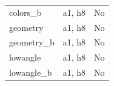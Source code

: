 \begin{longtable}{>{\raggedright\arraybackslash}p{.47\linewidth}>{\raggedright\arraybackslash}p{.25\linewidth}l}
colors\_\allowbreak{}b & %
a1, h8 & %
No \\ %

geometry & %
a1, h8 & %
No \\ %

geometry\_\allowbreak{}b & %
a1, h8 & %
No \\ %

lowangle & %
a1, h8 & %
No \\ %

lowangle\_\allowbreak{}b & %
a1, h8 & %
No \\ %


\end{longtable}
